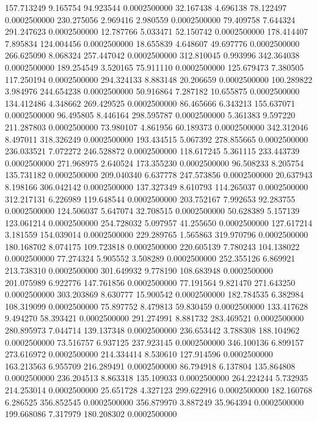 157.713249 9.165754 94.923544 0.0002500000
32.167438 4.696138 78.122497 0.0002500000
230.275056 2.969416 2.980559 0.0002500000
79.409758 7.644324 291.247623 0.0002500000
12.787766 5.033471 52.150742 0.0002500000
178.414407 7.895834 124.004456 0.0002500000
18.655839 4.648607 49.697776 0.0002500000
266.625090 8.068324 257.447042 0.0002500000
312.810045 0.993996 342.364038 0.0002500000
189.254549 3.520165 75.911110 0.0002500000
125.679473 7.380505 117.250194 0.0002500000
294.324133 8.883148 20.206659 0.0002500000
100.289822 3.984976 244.654238 0.0002500000
50.916864 7.287182 10.655875 0.0002500000
134.412486 4.348662 269.429525 0.0002500000
86.465666 6.343213 155.637071 0.0002500000
96.495805 8.446164 298.595787 0.0002500000
5.361383 9.597220 211.287803 0.0002500000
73.980107 4.861956 60.189373 0.0002500000
342.312046 8.497011 318.326249 0.0002500000
193.434515 5.067392 278.855665 0.0002500000
236.033521 7.072272 246.528872 0.0002500000
118.617245 5.361115 233.443739 0.0002500000
271.968975 2.640524 173.355230 0.0002500000
96.508233 8.205754 135.731182 0.0002500000
209.040340 6.637778 247.573856 0.0002500000
20.637943 8.198166 306.042142 0.0002500000
137.327349 8.610793 114.265037 0.0002500000
312.217131 6.226989 119.648544 0.0002500000
203.752167 7.992653 92.283755 0.0002500000
124.506037 5.647074 32.708515 0.0002500000
50.628389 5.157139 123.061214 0.0002500000
254.728032 5.097957 41.255650 0.0002500000
127.617214 3.181559 154.039014 0.0002500000
229.289765 1.565863 319.970796 0.0002500000
180.168702 8.074175 109.723818 0.0002500000
220.605139 7.780243 104.138022 0.0002500000
77.274324 5.905552 3.508289 0.0002500000
252.355126 6.869921 213.738310 0.0002500000
301.649932 9.778190 108.683948 0.0002500000
201.075989 6.922776 147.761856 0.0002500000
77.191564 9.821470 271.643250 0.0002500000
303.203869 8.630777 15.900542 0.0002500000
182.784535 6.382984 108.319099 0.0002500000
75.897752 8.479813 59.830459 0.0002500000
133.417628 9.494270 58.393421 0.0002500000
291.274991 8.881732 283.469521 0.0002500000
280.895973 7.044714 139.137348 0.0002500000
236.653442 3.788308 188.104962 0.0002500000
73.516757 6.937125 237.923145 0.0002500000
346.100136 6.899157 273.616972 0.0002500000
214.334414 8.530610 127.914596 0.0002500000
163.213563 6.955709 216.289491 0.0002500000
86.794918 6.137804 135.864808 0.0002500000
236.204513 8.863318 135.109033 0.0002500000
264.224244 5.732935 214.253014 0.0002500000
25.651728 4.327123 299.622916 0.0002500000
182.160768 6.286525 356.852545 0.0002500000
356.879970 3.887249 35.964394 0.0002500000
199.668086 7.317979 180.208302 0.0002500000
